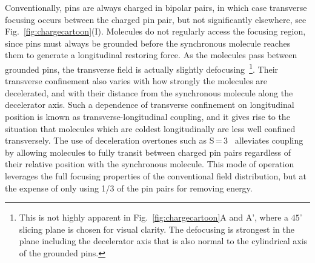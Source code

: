 \documentclass[%
 reprint,
 amsmath,amssymb,
 aps,
prl,
]{revtex4-1}
\begin{document}
Conventionally, pins are always charged in bipolar pairs, in which case transverse focusing occurs between the charged pin pair, but not significantly elsewhere, see Fig.~\ref{fig:chargecartoon}(I).
Molecules do not regularly access the focusing region, since pins must always be grounded before the synchronous molecule reaches them to generate a longitudinal restoring force.
As the molecules pass between grounded pins, the transverse field is actually slightly defocusing~\footnote{This is not highly apparent in Fig.~\ref{fig:chargecartoon}A and A', where a $45^\circ$ slicing plane is chosen for visual clarity. The defocusing is strongest in the plane including the decelerator axis that is also normal to the cylindrical axis of the grounded pins.}.  Their transverse confinement also varies with how strongly the molecules are decelerated, and with their distance from the synchronous molecule along the decelerator axis. Such a dependence of transverse confinement on longitudinal position is known as transverse-longitudinal coupling, and it gives rise to the situation that molecules which are coldest longitudinally are less well confined transversely.
The use of deceleration overtones such as S\,=\,3~\cite{VanDeMeerakker2005a} alleviates	coupling by allowing molecules to fully transit between charged pin pairs regardless of their relative position with the synchronous molecule. This mode of operation leverages the full focusing properties of the conventional field distribution, but at the expense of only using 1/3 of the pin pairs for removing energy.

\end{document}
